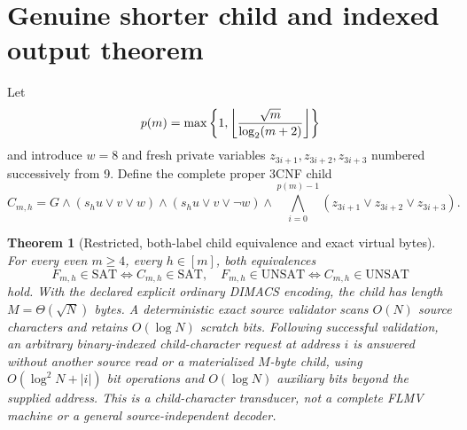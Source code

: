 \documentclass[11pt]{article}
\newtheorem{theorem}{Theorem}
\begin{document}
\section{Genuine shorter child and indexed output theorem}
Let
\[
 p(m)=\max\left\{1,\left\lfloor{\sqrt m\over\log_2(m+2)}\right\rfloor\right\}
\]
and introduce $w=8$ and fresh private variables $z_{3i+1},z_{3i+2},z_{3i+3}$ numbered successively from 9. Define the complete proper 3CNF child
\[
 C_{m,h}=G\land(s_hu\vee v\vee w)\land(s_hu\vee v\vee\neg w)
 \land\bigwedge_{i=0}^{p(m)-1}
 (z_{3i+1}\vee z_{3i+2}\vee z_{3i+3}).
\]
\begin{theorem}[Restricted, both-label child equivalence and exact virtual bytes]
For every even $m\ge4$, every $h\in[m]$, both equivalences
\[
 F_{m,h}\in\mathrm{SAT}\iff C_{m,h}\in\mathrm{SAT},
 \quad F_{m,h}\in\mathrm{UNSAT}\iff C_{m,h}\in\mathrm{UNSAT}
\]
hold. With the declared explicit ordinary DIMACS encoding, the child has length $M=\Theta(\sqrt N)$ bytes. A deterministic exact source validator scans $O(N)$ source characters and retains $O(\log N)$ scratch bits. Following successful validation, an arbitrary binary-indexed child-character request at address $i$ is answered without another source read or a materialized $M$-byte child, using $O(\log^2 N+|i|)$ bit operations and $O(\log N)$ auxiliary bits beyond the supplied address. This is a child-character transducer, not a complete FLMV machine or a general source-independent decoder.
\end{theorem}
\end{document}
